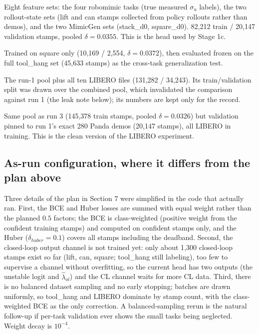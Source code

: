 \documentclass[11pt]{article}
\begin{document}
\begin{description}[leftmargin=1.6em]
\item[Run 1, pooled Panda head.] Eight feature sets: the four robomimic tasks
(true measured $\sigma_u$ labels), the two rollout-state sets (lift and can
stamps collected from policy rollouts rather than demos), and the two MimicGen
sets (stack\_d0, square\_d0). 82{,}212 train / 20{,}147 validation stamps,
pooled $\delta = 0.0355$. This is the head used by Stage 1c.
\item[Run 2, transfer test.] Trained on square only (10{,}169 / 2{,}554,
$\delta = 0.0372$), then evaluated frozen on the full tool\_hang set (45{,}633
stamps) as the cross-task generalization test.
\item[Run 3, Panda plus LIBERO, superseded.] The run-1 pool plus all ten LIBERO
files (131{,}282 / 34{,}243). Its train/validation split was drawn over the
combined pool, which invalidated the comparison against run 1 (the leak note
below); its numbers are kept only for the record.
\item[Run 3b, Panda plus LIBERO, pinned validation.] Same pool as run 3
(145{,}378 train stamps, pooled $\delta = 0.0326$) but validation pinned to
run 1's exact 280 Panda demos (20{,}147 stamps), all LIBERO in training. This is
the clean version of the LIBERO experiment.
\end{description}

\subsection{As-run configuration, where it differs from the plan above}

Three details of the plan in Section 7 were simplified in the code that actually
ran. First, the BCE and Huber losses are summed with equal weight rather than the
planned $0.5$ factors; the BCE is class-weighted (positive weight from the
confident training stamps) and computed on confident stamps only, and the Huber
($\delta_{huber}=0.1$) covers all stamps including the deadband. Second, the
closed-loop output channel is not trained yet: only about 1{,}300 closed-loop
stamps exist so far (lift, can, square; tool\_hang still labeling), too few to
supervise a channel without overfitting, so the current head has two outputs
(the unstable logit and $\hat\lambda_{ol}$) and the CL channel waits for more CL
data. Third, there is no balanced dataset sampling and no early stopping; batches
are drawn uniformly, so tool\_hang and LIBERO dominate by stamp count, with the
class-weighted BCE as the only correction. A balanced-sampling rerun is the
natural follow-up if per-task validation ever shows the small tasks being
neglected. Weight decay is $10^{-4}$.
\end{document}
